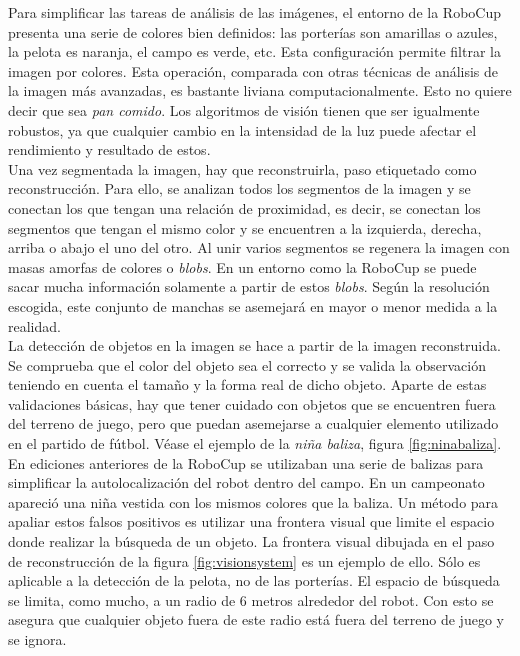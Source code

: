 Para simplificar las tareas de análisis de las imágenes, el entorno de la RoboCup presenta una serie de colores bien definidos: las porterías son amarillas o azules, la pelota es naranja, el campo es verde, etc. Esta configuración permite filtrar la imagen por colores. Esta operación, comparada con otras técnicas de análisis de la imagen más avanzadas, es bastante liviana computacionalmente. Esto no quiere decir que sea \textit{pan comido}. Los algoritmos de visión tienen que ser igualmente robustos, ya que cualquier cambio en la intensidad de la luz puede afectar el rendimiento y resultado de estos. \\

Una vez segmentada la imagen, hay que reconstruirla, paso etiquetado como reconstrucción. Para ello, se analizan todos los segmentos de la imagen y se conectan los que tengan una relación de proximidad, es decir, se conectan los segmentos que tengan el mismo color y se encuentren a la izquierda, derecha, arriba o abajo el uno del otro. Al unir varios segmentos se regenera la imagen con masas amorfas de colores o \textit{blobs}. En un entorno como la RoboCup se puede sacar mucha información solamente a partir de estos \textit{blobs}. Según la resolución escogida, este conjunto de manchas se asemejará en mayor o menor medida a la realidad. \\

La detección de objetos en la imagen se hace a partir de la imagen reconstruida. Se comprueba que el color del objeto sea el correcto y se valida la observación teniendo en cuenta el tamaño y la forma real de dicho objeto. Aparte de estas validaciones básicas, hay que tener cuidado con objetos que se encuentren fuera del terreno de juego, pero que puedan asemejarse a cualquier elemento utilizado en el partido de fútbol. Véase el ejemplo de la \textit{niña baliza}, figura \ref{fig:ninabaliza}. En ediciones anteriores de la RoboCup se utilizaban una serie de balizas para simplificar la autolocalización del robot dentro del campo. En un campeonato apareció una niña vestida con los mismos colores que la baliza. Un método para apaliar estos falsos positivos es utilizar una frontera visual que limite el espacio donde realizar la búsqueda de un objeto. La frontera visual dibujada en el paso de reconstrucción de la figura \ref{fig:visionsystem} es un ejemplo de ello. Sólo es aplicable a la detección de la pelota, no de las porterías. El espacio de búsqueda se limita, como mucho, a un radio de 6 metros alrededor del robot. Con esto se asegura que cualquier objeto fuera de este radio está fuera del terreno de juego y se ignora. \\

